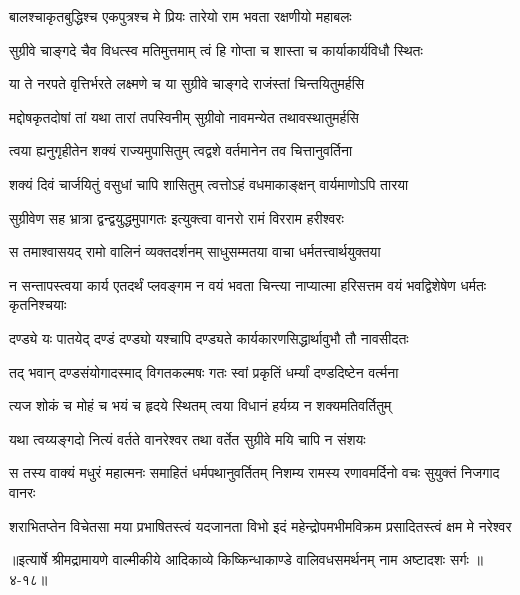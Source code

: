 \twolineshloka
{बालश्चाकृतबुद्धिश्च एकपुत्रश्च मे प्रियः}
{तारेयो राम भवता रक्षणीयो महाबलः} %

\twolineshloka
{सुग्रीवे चाङ्गदे चैव विधत्स्व मतिमुत्तमाम्}
{त्वं हि गोप्ता च शास्ता च कार्याकार्यविधौ स्थितः} %

\twolineshloka
{या ते नरपते वृत्तिर्भरते लक्ष्मणे च या}
{सुग्रीवे चाङ्गदे राजंस्तां चिन्तयितुमर्हसि} %

\twolineshloka
{मद्दोषकृतदोषां तां यथा तारां तपस्विनीम्}
{सुग्रीवो नावमन्येत तथावस्थातुमर्हसि} %

\twolineshloka
{त्वया ह्यनुगृहीतेन शक्यं राज्यमुपासितुम्}
{त्वद्वशे वर्तमानेन तव चित्तानुवर्तिना} %

\twolineshloka
{शक्यं दिवं चार्जयितुं वसुधां चापि शासितुम्}
{त्वत्तोऽहं वधमाकाङ्क्षन् वार्यमाणोऽपि तारया} %

\twolineshloka
{सुग्रीवेण सह भ्रात्रा द्वन्द्वयुद्धमुपागतः}
{इत्युक्त्वा वानरो रामं विरराम हरीश्वरः} %

\twolineshloka
{स तमाश्वासयद् रामो वालिनं व्यक्तदर्शनम्}
{साधुसम्मतया वाचा धर्मतत्त्वार्थयुक्तया} %

\threelineshloka
{न सन्तापस्त्वया कार्य एतदर्थं प्लवङ्गम}
{न वयं भवता चिन्त्या नाप्यात्मा हरिसत्तम}
{वयं भवद्विशेषेण धर्मतः कृतनिश्चयाः} %

\twolineshloka
{दण्ड्ये यः पातयेद् दण्डं दण्ड्यो यश्चापि दण्ड्यते}
{कार्यकारणसिद्धार्थावुभौ तौ नावसीदतः} %

\twolineshloka
{तद् भवान् दण्डसंयोगादस्माद् विगतकल्मषः}
{गतः स्वां प्रकृतिं धर्म्यां दण्डदिष्टेन वर्त्मना} %

\twolineshloka
{त्यज शोकं च मोहं च भयं च हृदये स्थितम्}
{त्वया विधानं हर्यग्र्य न शक्यमतिवर्तितुम्} %

\twolineshloka
{यथा त्वय्यङ्गदो नित्यं वर्तते वानरेश्वर}
{तथा वर्तेत सुग्रीवे मयि चापि न संशयः} %

\twolineshloka
{स तस्य वाक्यं मधुरं महात्मनः समाहितं धर्मपथानुवर्तितम्}
{निशम्य रामस्य रणावमर्दिनो वचः सुयुक्तं निजगाद वानरः} %

\twolineshloka
{शराभितप्तेन विचेतसा मया प्रभाषितस्त्वं यदजानता विभो}
{इदं महेन्द्रोपमभीमविक्रम प्रसादितस्त्वं क्षम मे नरेश्वर} %


॥इत्यार्षे श्रीमद्रामायणे वाल्मीकीये आदिकाव्ये किष्किन्धाकाण्डे वालिवधसमर्थनम् नाम अष्टादशः सर्गः ॥४-१८॥

